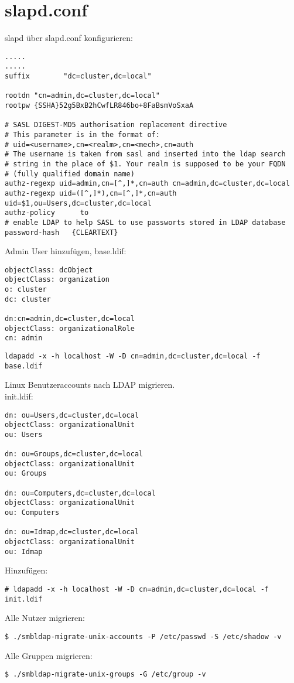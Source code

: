 \section{slapd.conf}
slapd über slapd.conf konfigurieren:
\begin{lstlisting}[style=Bash]
.....
.....
suffix        "dc=cluster,dc=local"

rootdn "cn=admin,dc=cluster,dc=local"
rootpw {SSHA}52g5BxB2hCwfLR846bo+8FaBsmVoSxaA

# SASL DIGEST-MD5 authorisation replacement directive
# This parameter is in the format of:
# uid=<username>,cn=<realm>,cn=<mech>,cn=auth
# The username is taken from sasl and inserted into the ldap search 
# string in the place of $1. Your realm is supposed to be your FQDN 
# (fully qualified domain name)
authz-regexp uid=admin,cn=[^,]*,cn=auth cn=admin,dc=cluster,dc=local
authz-regexp uid=([^,]*),cn=[^,]*,cn=auth uid=$1,ou=Users,dc=cluster,dc=local
authz-policy      to
# enable LDAP to help SASL to use passworts stored in LDAP database
password-hash   {CLEARTEXT}
\end{lstlisting}
Admin User hinzufügen, base.ldif:
\begin{lstlisting}[style=Bash]
objectClass: dcObject
objectClass: organization
o: cluster
dc: cluster

dn:cn=admin,dc=cluster,dc=local
objectClass: organizationalRole
cn: admin
\end{lstlisting}
\begin{lstlisting}[style=Bash]
ldapadd -x -h localhost -W -D cn=admin,dc=cluster,dc=local -f base.ldif 
\end{lstlisting}
Linux Benutzeraccounts nach LDAP migrieren.\\
init.ldif:
\begin{lstlisting}[style=Bash]
dn: ou=Users,dc=cluster,dc=local
objectClass: organizationalUnit
ou: Users

dn: ou=Groups,dc=cluster,dc=local
objectClass: organizationalUnit
ou: Groups

dn: ou=Computers,dc=cluster,dc=local
objectClass: organizationalUnit
ou: Computers

dn: ou=Idmap,dc=cluster,dc=local
objectClass: organizationalUnit
ou: Idmap
\end{lstlisting}
Hinzufügen:
\begin{lstlisting}[style=Bash]
# ldapadd -x -h localhost -W -D cn=admin,dc=cluster,dc=local -f init.ldif
\end{lstlisting}
Alle Nutzer migrieren:
\begin{lstlisting}[style=Bash]
$ ./smbldap-migrate-unix-accounts -P /etc/passwd -S /etc/shadow -v
\end{lstlisting}
Alle Gruppen migrieren:
\begin{lstlisting}[style=Bash]
$ ./smbldap-migrate-unix-groups -G /etc/group -v 
\end{lstlisting}
